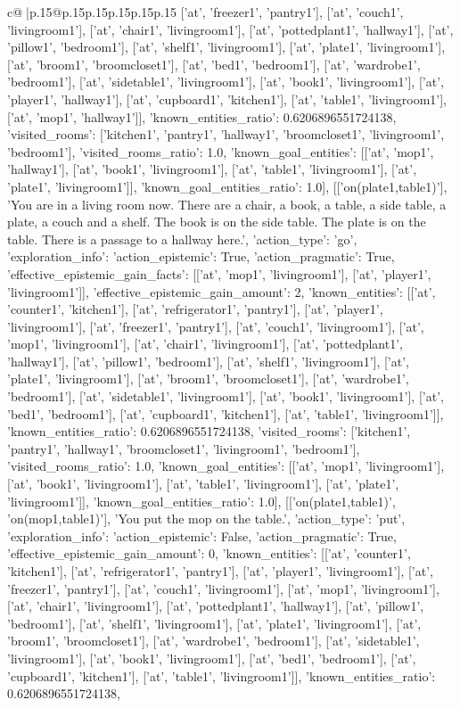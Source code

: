 \documentclass{article}
\begin{document}
{\begin{supertabular}{c@{$\;$}|p{.15\linewidth}@{}p{.15\linewidth}p{.15\linewidth}p{.15\linewidth}p{.15\linewidth}p{.15\linewidth}}
{{{['at', 'freezer1', 'pantry1'], ['at', 'couch1', 'livingroom1'], ['at', 'chair1', 'livingroom1'], ['at', 'pottedplant1', 'hallway1'], ['at', 'pillow1', 'bedroom1'], ['at', 'shelf1', 'livingroom1'], ['at', 'plate1', 'livingroom1'], ['at', 'broom1', 'broomcloset1'], ['at', 'bed1', 'bedroom1'], ['at', 'wardrobe1', 'bedroom1'], ['at', 'sidetable1', 'livingroom1'], ['at', 'book1', 'livingroom1'], ['at', 'player1', 'hallway1'], ['at', 'cupboard1', 'kitchen1'], ['at', 'table1', 'livingroom1'], ['at', 'mop1', 'hallway1']], 'known_entities_ratio': 0.6206896551724138, 'visited_rooms': ['kitchen1', 'pantry1', 'hallway1', 'broomcloset1', 'livingroom1', 'bedroom1'], 'visited_rooms_ratio': 1.0, 'known_goal_entities': [['at', 'mop1', 'hallway1'], ['at', 'book1', 'livingroom1'], ['at', 'table1', 'livingroom1'], ['at', 'plate1', 'livingroom1']], 'known_goal_entities_ratio': 1.0}}], [['on(plate1,table1)'], 'You are in a living room now. There are a chair, a book, a table, a side table, a plate, a couch and a shelf. The book is on the side table. The plate is on the table. There is a passage to a hallway here.', {'action_type': 'go', 'exploration_info': {'action_epistemic': True, 'action_pragmatic': True, 'effective_epistemic_gain_facts': [['at', 'mop1', 'livingroom1'], ['at', 'player1', 'livingroom1']], 'effective_epistemic_gain_amount': 2, 'known_entities': [['at', 'counter1', 'kitchen1'], ['at', 'refrigerator1', 'pantry1'], ['at', 'player1', 'livingroom1'], ['at', 'freezer1', 'pantry1'], ['at', 'couch1', 'livingroom1'], ['at', 'mop1', 'livingroom1'], ['at', 'chair1', 'livingroom1'], ['at', 'pottedplant1', 'hallway1'], ['at', 'pillow1', 'bedroom1'], ['at', 'shelf1', 'livingroom1'], ['at', 'plate1', 'livingroom1'], ['at', 'broom1', 'broomcloset1'], ['at', 'wardrobe1', 'bedroom1'], ['at', 'sidetable1', 'livingroom1'], ['at', 'book1', 'livingroom1'], ['at', 'bed1', 'bedroom1'], ['at', 'cupboard1', 'kitchen1'], ['at', 'table1', 'livingroom1']], 'known_entities_ratio': 0.6206896551724138, 'visited_rooms': ['kitchen1', 'pantry1', 'hallway1', 'broomcloset1', 'livingroom1', 'bedroom1'], 'visited_rooms_ratio': 1.0, 'known_goal_entities': [['at', 'mop1', 'livingroom1'], ['at', 'book1', 'livingroom1'], ['at', 'table1', 'livingroom1'], ['at', 'plate1', 'livingroom1']], 'known_goal_entities_ratio': 1.0}}], [['on(plate1,table1)', 'on(mop1,table1)'], 'You put the mop on the table.', {'action_type': 'put', 'exploration_info': {'action_epistemic': False, 'action_pragmatic': True, 'effective_epistemic_gain_amount': 0, 'known_entities': [['at', 'counter1', 'kitchen1'], ['at', 'refrigerator1', 'pantry1'], ['at', 'player1', 'livingroom1'], ['at', 'freezer1', 'pantry1'], ['at', 'couch1', 'livingroom1'], ['at', 'mop1', 'livingroom1'], ['at', 'chair1', 'livingroom1'], ['at', 'pottedplant1', 'hallway1'], ['at', 'pillow1', 'bedroom1'], ['at', 'shelf1', 'livingroom1'], ['at', 'plate1', 'livingroom1'], ['at', 'broom1', 'broomcloset1'], ['at', 'wardrobe1', 'bedroom1'], ['at', 'sidetable1', 'livingroom1'], ['at', 'book1', 'livingroom1'], ['at', 'bed1', 'bedroom1'], ['at', 'cupboard1', 'kitchen1'], ['at', 'table1', 'livingroom1']], 'known_entities_ratio': 0.6206896551724138, }}}
\end{supertabular}}
\end{document}
